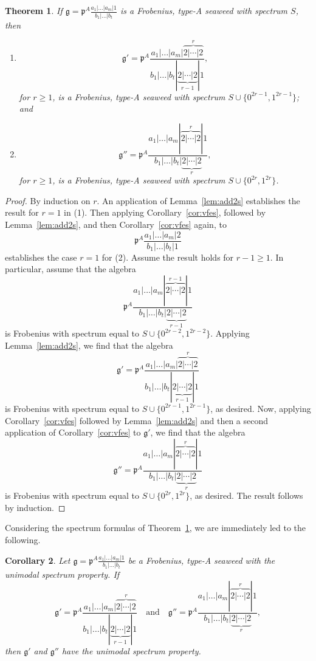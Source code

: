 \documentclass[letterpaper,10pt]{article}
\newtheorem{theorem}{Theorem}
\newtheorem{corollary}[theorem]{Corollary}
\begin{document}
\begin{theorem}\label{thm:addm2s}
If $\mathfrak{g}=\mathfrak{p}^A\frac{a_1|\hdots|a_m|1}{b_1|\hdots|b_t}$ is a Frobenius, type-A seaweed with spectrum $S$, then
\begin{enumerate}
    \item[\textup{(1)}] $$\mathfrak{g}'=\mathfrak{p}^A\frac{a_1|\hdots|a_m|\overbrace{2|\cdots|2}^r}{b_1|\hdots|b_t|\underbrace{2|\cdots|2}_{r-1}|1},$$ for $r\ge 1$, is a Frobenius, type-A seaweed with spectrum $S\cup\{0^{2r-1},1^{2r-1}\}$; and
    \item[\textup{(2)}] $$\mathfrak{g}''=\mathfrak{p}^A\frac{a_1|\hdots|a_m|\overbrace{2|\cdots|2}^r|1}{b_1|\hdots|b_t|\underbrace{2|\cdots|2}_{r}},$$ for $r\ge 1$, is a Frobenius, type-A seaweed with spectrum $S\cup\{0^{2r},1^{2r}\}$.
\end{enumerate}
\end{theorem}
\begin{proof}
By induction on $r$. An application of Lemma~\ref{lem:add2s} establishes the result for $r=1$ in (1). Then applying Corollary~\ref{cor:vfes}, followed by Lemma~\ref{lem:add2s}, and then Corollary~\ref{cor:vfes} again, to $$\mathfrak{p}^A\frac{a_1|\hdots|a_m|2}{b_1|\hdots|b_t|1}$$ establishes the case $r=1$ for (2). Assume the result holds for $r-1\ge 1$. In particular, assume that the algebra $$\mathfrak{p}^A\frac{a_1|\hdots|a_m|\overbrace{2|\cdots|2}^{r-1}|1}{b_1|\hdots|b_t|\underbrace{2|\cdots|2}_{r-1}}$$ is Frobenius with spectrum equal to $S\cup \{0^{2r-2},1^{2r-2}\}$. Applying Lemma~\ref{lem:add2s}, we find that the algebra $$\mathfrak{g}'=\mathfrak{p}^A\frac{a_1|\hdots|a_m|\overbrace{2|\cdots|2}^r}{b_1|\hdots|b_t|\underbrace{2|\cdots|2}_{r-1}|1}$$ is Frobenius with spectrum equal to $S\cup \{0^{2r-1},1^{2r-1}\}$, as desired. Now, applying Corollary~\ref{cor:vfes} followed by Lemma~\ref{lem:add2s} and then a second application of Corollary~\ref{cor:vfes} to $\mathfrak{g}'$, we find that the algebra $$\mathfrak{g}''=\mathfrak{p}^A\frac{a_1|\hdots|a_m|\overbrace{2|\cdots|2}^r|1}{b_1|\hdots|b_t|\underbrace{2|\cdots|2}_{r}}$$ is Frobenius with spectrum equal to $S\cup\{0^{2r},1^{2r}\}$, as desired. The result follows by induction.
\end{proof}

Considering the spectrum formulas of Theorem~\ref{thm:addm2s}, we are immediately led to the following.

\begin{corollary}\label{cor:222}
Let $\mathfrak{g}=\mathfrak{p}^A\frac{a_1|\hdots|a_m|1}{b_1|\hdots|b_t}$ be a Frobenius, type-A seaweed with the unimodal spectrum property. If
$$\mathfrak{g}'=\mathfrak{p}^A\frac{a_1|\hdots|a_m|\overbrace{2|\cdots|2}^r}{b_1|\hdots|b_t|\underbrace{2|\cdots|2}_{r-1}|1}\quad\text{and}\quad \mathfrak{g}''=\mathfrak{p}^A\frac{a_1|\hdots|a_m|\overbrace{2|\cdots|2}^r|1}{b_1|\hdots|b_t|\underbrace{2|\cdots|2}_{r}},$$ then $\mathfrak{g}'$ and $\mathfrak{g}''$ have the unimodal spectrum property.
\end{corollary}
\end{document}
